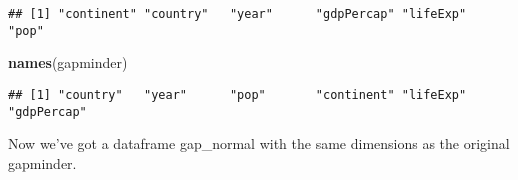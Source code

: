 \documentclass[
]{article}
\newenvironment{Shaded}{\begin{snugshade}}{\end{snugshade}}
\newcommand{\FunctionTok}[1]{\textcolor[rgb]{0.13,0.29,0.53}{\textbf{#1}}}
\newcommand{\NormalTok}[1]{#1}
\begin{document}
\begin{verbatim}
## [1] "continent" "country"   "year"      "gdpPercap" "lifeExp"   "pop"
\end{verbatim}

\begin{Shaded}
\begin{Highlighting}[]
\FunctionTok{names}\NormalTok{(gapminder)}
\end{Highlighting}
\end{Shaded}

\begin{verbatim}
## [1] "country"   "year"      "pop"       "continent" "lifeExp"   "gdpPercap"
\end{verbatim}

Now we've got a dataframe gap\_normal with the same dimensions as the
original gapminder.
\end{document}
